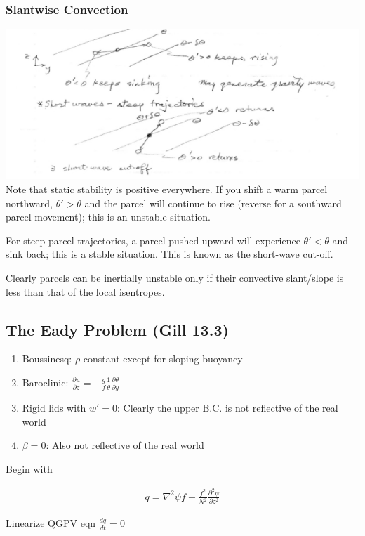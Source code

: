 \documentclass[a4paper,12pt]{article}
\begin{document}
\subsubsection*{Slantwise Convection}
\includegraphics[width=\textwidth]{2}
Note that static stability is positive everywhere. If you shift a warm parcel northward, $\theta' > \theta$ and the parcel will continue to rise (reverse for a southward parcel movement); this is an unstable situation. 

For steep parcel trajectories, a parcel pushed upward will experience $\theta'<\theta$ and sink back; this is a stable situation. This is known as the short-wave cut-off.

Clearly parcels can be inertially unstable only if their convective slant/slope is less than that of the local isentropes.

\subsection*{The Eady Problem (Gill 13.3)}
\begin{enumerate}
	\item Boussinesq: $\rho$ constant except for sloping buoyancy
	\item Baroclinic: $\frac{\partial u}{\partial z} = -\frac{g}{f}\frac{1}{\theta}\frac{\partial \theta}{\partial y}$
	\item Rigid lids with $w' = 0$: Clearly the upper B.C. is not reflective of the real world
	\item $\beta = 0$: Also not reflective of the real world
\end{enumerate}

Begin with

\begin{align*}
q = \nabla^2 \psi f + \frac{f^2}{N^2}\frac{\partial^2\psi}{\partial z^2}
\end{align*}

Linearize QGPV eqn $\frac{dq}{dt} = 0$
\end{document}
